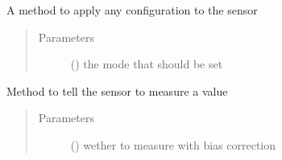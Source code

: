 \documentclass[letterpaper,10pt,english]{sphinxmanual}
\begin{document}
\begin{fulllineitems}
\begin{fulllineitems}
\end{fulllineitems}


\begin{fulllineitems}
\label{\detokenize{sensor:lib.sensor.SensorInterface.configure}}
A method to apply any configuration to the sensor
\begin{quote}\begin{description}
\item[{Parameters}] \leavevmode
{} () \textendash{} the mode that should be set

\end{description}\end{quote}

\end{fulllineitems}


\begin{fulllineitems}
\label{\detokenize{sensor:lib.sensor.SensorInterface.measure}}
Method to tell the sensor to measure a value
\begin{quote}\begin{description}
\item[{Parameters}] \leavevmode
{} () \textendash{} wether to measure with bias correction

\end{description}\end{quote}

\end{fulllineitems}



\end{fulllineitems}
\end{document}
